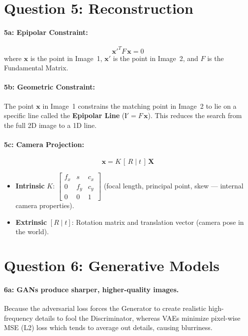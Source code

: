 \documentclass[11pt]{article}
\begin{document}
\section*{Question 5: Reconstruction}

\paragraph{5a: Epipolar Constraint:}
$$ \mathbf{x}'^{\!T} F \,\mathbf{x} = 0 $$
where $\mathbf{x}$ is the point in Image~1, $\mathbf{x}'$ is the point in Image~2, and $F$ is the Fundamental Matrix.

\paragraph{5b: Geometric Constraint:} The point $\mathbf{x}$ in Image~1 constrains the matching point in Image~2 to lie on a specific line called the \textbf{Epipolar Line} ($\mathbf{l}' = F\,\mathbf{x}$). This reduces the search from the full 2D image to a 1D line.

\paragraph{5c: Camera Projection:}
$$ \mathbf{x} = K \, [\,R \mid t\,] \, \mathbf{X} $$
\begin{itemize}
    \item \textbf{Intrinsic} $K$: $\begin{bmatrix} f_x & s & c_x \\ 0 & f_y & c_y \\ 0 & 0 & 1 \end{bmatrix}$ (focal length, principal point, skew --- internal camera properties).
    \item \textbf{Extrinsic} $[R \mid t]$: Rotation matrix and translation vector (camera pose in the world).
\end{itemize}

\section*{Question 6: Generative Models}

\paragraph{6a: GANs produce sharper, higher-quality images.} Because the adversarial loss forces the Generator to create realistic high-frequency details to fool the Discriminator, whereas VAEs minimize pixel-wise MSE (L2) loss which tends to average out details, causing blurriness.
\end{document}
